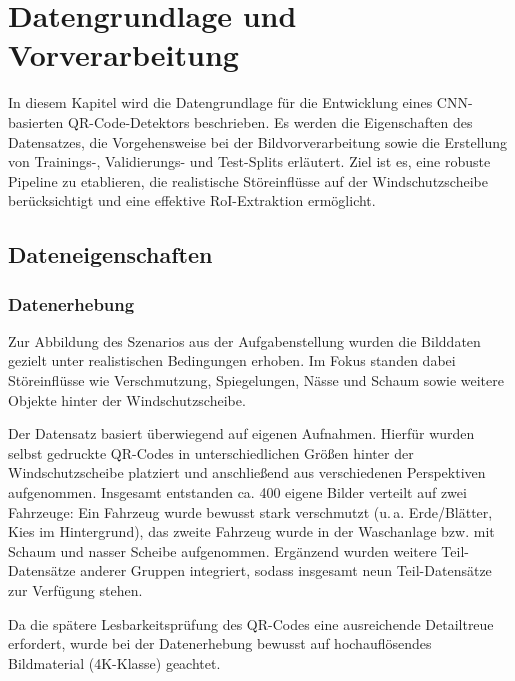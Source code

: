 \chapter{Datengrundlage und Vorverarbeitung}
\label{ch:datengrundlage}

In diesem Kapitel wird die Datengrundlage für die Entwicklung eines \ac{CNN}-basierten \ac{QR}-Code-Detektors beschrieben. Es werden die Eigenschaften des Datensatzes, die Vorgehensweise bei der Bildvorverarbeitung sowie die Erstellung von Trainings-, Validierungs- und Test-Splits erläutert. Ziel ist es, eine robuste Pipeline zu etablieren, die realistische Störeinflüsse auf der Windschutzscheibe berücksichtigt und eine effektive \ac{RoI}-Extraktion ermöglicht.

\section{Dateneigenschaften}
\label{sec:dateneigenschaften}

\subsection{Datenerhebung}
\label{sec:datenerhebung}
Zur Abbildung des Szenarios aus der Aufgabenstellung wurden die Bilddaten gezielt unter realistischen Bedingungen erhoben. Im Fokus standen dabei Störeinflüsse wie Verschmutzung, Spiegelungen, Nässe und Schaum sowie weitere Objekte hinter der Windschutzscheibe.

Der Datensatz basiert überwiegend auf eigenen Aufnahmen. Hierfür wurden selbst gedruckte \ac{QR}-Codes in unterschiedlichen Größen hinter der Windschutzscheibe platziert und anschließend aus verschiedenen Perspektiven aufgenommen. Insgesamt entstanden ca. 400 eigene Bilder verteilt auf zwei Fahrzeuge: Ein Fahrzeug wurde bewusst stark verschmutzt (u.\,a. Erde/Blätter, Kies im Hintergrund), das zweite Fahrzeug wurde in der Waschanlage bzw. mit Schaum und nasser Scheibe aufgenommen. Ergänzend wurden weitere Teil-Datensätze anderer Gruppen integriert, sodass insgesamt neun Teil-Datensätze zur Verfügung stehen.

Da die spätere Lesbarkeitsprüfung des \ac{QR}-Codes eine ausreichende Detailtreue erfordert, wurde bei der Datenerhebung bewusst auf hochauflösendes Bildmaterial (4K-Klasse) geachtet.

